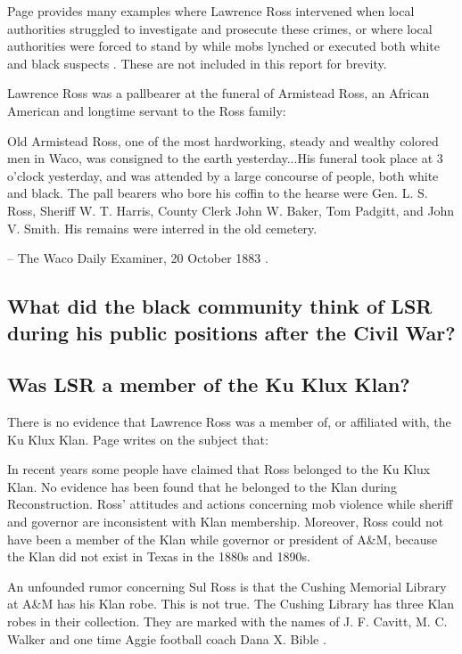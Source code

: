 \documentclass[12pt]{article}
\begin{document}
Page provides many examples where Lawrence Ross intervened when local authorities struggled to investigate and prosecute these crimes, or where local authorities were forced to stand by while mobs lynched or executed both white and black suspects \cite[pg. 95--155, etc]{page}. These are not included in this report for brevity.

Lawrence Ross was a pallbearer at the funeral of Armistead Ross, an African American and longtime servant to the Ross family:
\begin{displayquote}
Old Armistead Ross, one of the most hardworking, steady and wealthy colored men in Waco, was consigned to the earth yesterday...His funeral took place at 3 o’clock yesterday, and was attended by a large concourse of people, both white and black. The pall bearers who bore his coffin to the hearse were Gen. L. S. Ross, Sheriff W. T. Harris, County Clerk John W. Baker, Tom Padgitt, and John V. Smith. His remains were interred in the old cemetery.

-- The Waco Daily Examiner, 20 October 1883 \cite{wde:1883-10-20}.
\end{displayquote}

\subsection{What did the black community think of LSR during his public positions after the Civil War?}

\subsection{Was LSR a member of the Ku Klux Klan?}
There is no evidence that Lawrence Ross was a member of, or affiliated with, the Ku Klux Klan. Page writes on the subject that:

\begin{displayquote}
In recent years some people have claimed that Ross belonged to the Ku Klux Klan.  No evidence has been found that he belonged to the Klan during Reconstruction.  Ross’ attitudes and actions concerning mob violence while sheriff and governor are inconsistent with Klan membership.  Moreover, Ross could not have been a member of the Klan while governor or president of A\&M, because the Klan did not exist in Texas in the 1880s and 1890s.

An unfounded rumor concerning Sul Ross is that the Cushing Memorial Library at A\&M has his Klan robe.  This is not true.  The Cushing Library has three Klan robes in their collection.  They are marked with the names of J. F. Cavitt, M. C. Walker and one time Aggie football coach Dana X. Bible \cite[pg. 253]{page}.
\end{displayquote}
\end{document}
